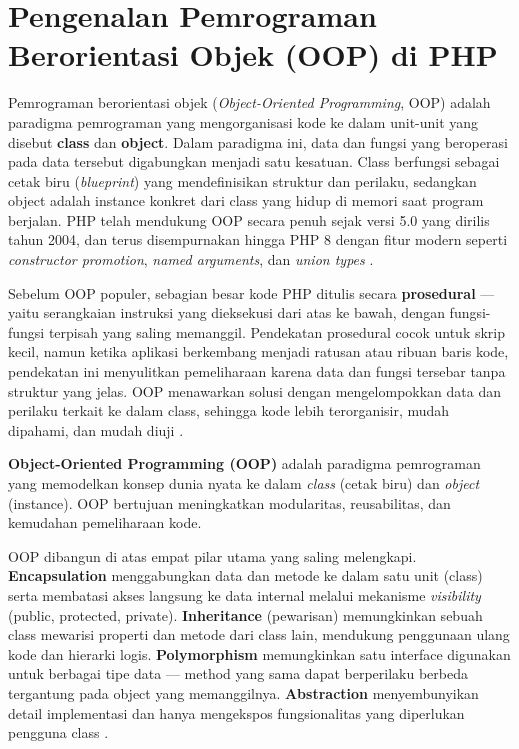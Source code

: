 ﻿\section{Pengenalan Pemrograman Berorientasi Objek (OOP) di PHP}

Pemrograman berorientasi objek (\textit{Object-Oriented Programming}, OOP) adalah paradigma pemrograman yang mengorganisasi kode ke dalam unit-unit yang disebut \textbf{class} dan \textbf{object}. Dalam paradigma ini, data dan fungsi yang beroperasi pada data tersebut digabungkan menjadi satu kesatuan. Class berfungsi sebagai cetak biru (\textit{blueprint}) yang mendefinisikan struktur dan perilaku, sedangkan object adalah instance konkret dari class yang hidup di memori saat program berjalan. PHP telah mendukung OOP secara penuh sejak versi 5.0 yang dirilis tahun 2004, dan terus disempurnakan hingga PHP 8 dengan fitur modern seperti \textit{constructor promotion}, \textit{named arguments}, dan \textit{union types} \cite{phpManual}.

Sebelum OOP populer, sebagian besar kode PHP ditulis secara \textbf{prosedural} --- yaitu serangkaian instruksi yang dieksekusi dari atas ke bawah, dengan fungsi-fungsi terpisah yang saling memanggil. Pendekatan prosedural cocok untuk skrip kecil, namun ketika aplikasi berkembang menjadi ratusan atau ribuan baris kode, pendekatan ini menyulitkan pemeliharaan karena data dan fungsi tersebar tanpa struktur yang jelas. OOP menawarkan solusi dengan mengelompokkan data dan perilaku terkait ke dalam class, sehingga kode lebih terorganisir, mudah dipahami, dan mudah diuji \cite{phpRightWay}.

\begin{konsep}
\textbf{Object-Oriented Programming (OOP)} adalah paradigma pemrograman yang memodelkan konsep dunia nyata ke dalam \textit{class} (cetak biru) dan \textit{object} (instance). OOP bertujuan meningkatkan modularitas, reusabilitas, dan kemudahan pemeliharaan kode.
\end{konsep}

OOP dibangun di atas empat pilar utama yang saling melengkapi. \textbf{Encapsulation} menggabungkan data dan metode ke dalam satu unit (class) serta membatasi akses langsung ke data internal melalui mekanisme \textit{visibility} (public, protected, private). \textbf{Inheritance} (pewarisan) memungkinkan sebuah class mewarisi properti dan metode dari class lain, mendukung penggunaan ulang kode dan hierarki logis. \textbf{Polymorphism} memungkinkan satu interface digunakan untuk berbagai tipe data --- method yang sama dapat berperilaku berbeda tergantung pada object yang memanggilnya. \textbf{Abstraction} menyembunyikan detail implementasi dan hanya mengekspos fungsionalitas yang diperlukan pengguna class \cite{phpManual}.

